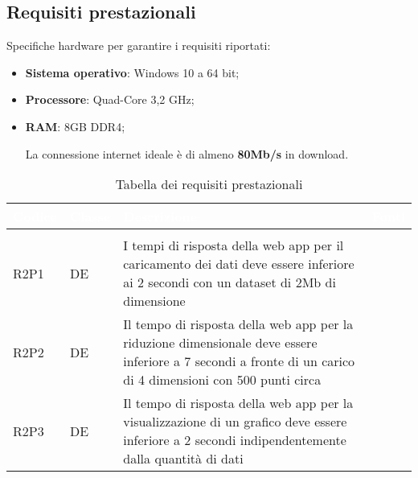 \subsection{Requisiti prestazionali}


Specifiche hardware per garantire i requisiti riportati:
\begin{itemize}

\item \textbf{Sistema operativo}: Windows 10 a 64 bit;
\item \textbf{Processore}: Quad-Core 3,2 GHz;
\item \textbf{RAM}: 8GB DDR4;

La connessione internet ideale è di almeno \textbf{80Mb/s} in download.

\end{itemize}

\renewcommand{\arraystretch}{1.5}
{
\setlength\arrayrulewidth{1pt}
\begin{longtable}{C{2cm} | C{1.5cm} | C{9cm} | C{3.3cm}}
		\textcolor{white}{\textbf{Codice}} & 
		\textcolor{white}{\textbf{Classe}} & 
		\textcolor{white}{\textbf{Descrizione}} & 
		\textcolor{white}{\textbf{Fonti}} \\
		\endfirsthead
	    \\
	    \endfoot
	    \caption{Tabella dei requisiti prestazionali}
	    \endlastfoot
	    
R2P1 & DE & I tempi di risposta della web app per il caricamento dei dati deve essere inferiore ai 2 secondi con un dataset di 2Mb di dimensione & \\
R2P2 & DE & Il tempo di risposta della web app per la riduzione dimensionale deve essere inferiore a 7 secondi a fronte di un carico di 4 dimensioni con 500 punti circa & \\
R2P3 & DE & Il tempo di risposta della web app per la visualizzazione di un grafico deve essere inferiore a 2 secondi indipendentemente dalla quantità di dati & \\

\end{longtable}
}
\newpage
